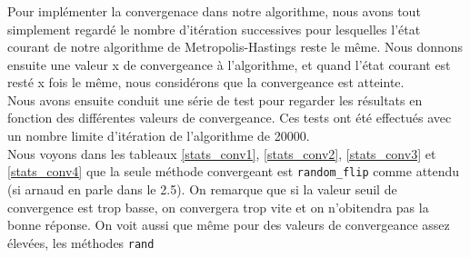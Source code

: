 \documentclass[11pt]{report}
\begin{document}
\subsubsection{}
Pour implémenter la convergenace dans notre algorithme, nous avons tout simplement regardé le nombre d'itération successives pour lesquelles l'état courant de notre algorithme de Metropolis-Hastings reste le même. Nous donnons ensuite une valeur x de convergeance à l'algorithme, et quand l'état courant est resté x fois le même, nous considérons que la convergeance est atteinte. \\

Nous avons ensuite conduit une série de test pour regarder les résultats en fonction des différentes valeurs de convergeance. Ces tests ont été effectués avec un nombre limite d'itération de l'algorithme de 20000.\\

Nous voyons dans les tableaux \ref{stats_conv1}, \ref{stats_conv2}, \ref{stats_conv3} et \ref{stats_conv4} que la seule méthode convergeant est \texttt{random\_flip} comme attendu (si arnaud en parle dans le 2.5). On remarque que si la valeur seuil de convergence est trop basse, on convergera trop vite et on n'obitendra pas la bonne réponse. On voit aussi que même pour des valeurs de convergeance assez élevées, les méthodes \texttt{rand}
\end{document}
